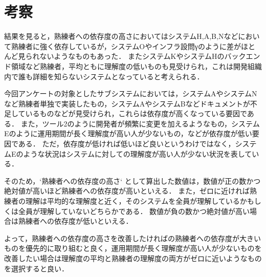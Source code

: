 \section{考察}
結果を見ると，熟練者への依存度の高さにおいてはシステムH,A,B,Nなどにおいて熟練者に強く依存しているが，システムOやインフラ設問γのように差がほとんど見られないようなものもあった．
またシステムKやシステムHのバックエンド領域など熟練者，平均ともに理解度の低いものも見受けられ，これは開発組織内で誰も詳細を知らないシステムとなっていると考えられる．

今回アンケートの対象としたサブシステムにおいては，システムAやシステムNなど熟練者単独で実装したもの，システムAやシステムBなどドキュメントが不足しているものなどが見受けられ，これらは依存度が高くなっている要因である．
また，ツール2のように開発者が頻繁に変更を加えるようなもの，システムEのように運用期間が長く理解度が高い人が少ないもの，などが依存度が低い要因である．
ただ，依存度が低ければ低いほど良いというわけではなく，システムEのような状況はシステムに対しての理解度が高い人が少ない状況を表している．

そのため，`熟練者への依存度の高さ` として算出した数値は，数値が正の数かつ絶対値が高いほど熟練者への依存度が高いといえる．
また，ゼロに近ければ熟練者の理解は平均的な理解度と近く，そのシステムを全員が理解しているかもしくは全員が理解していないどちらかである．
数値が負の数かつ絶対値が高い場合は熟練者への依存度が低いといえる．

よって，熟練者への依存度の高さを改善したければの熟練者への依存度が大きいものを優先的に取り組むと良く，運用期間が長く理解度が高い人が少ないものを改善したい場合は理解度の平均と熟練者の理解度の両方がゼロに近いようなものを選択すると良い．
